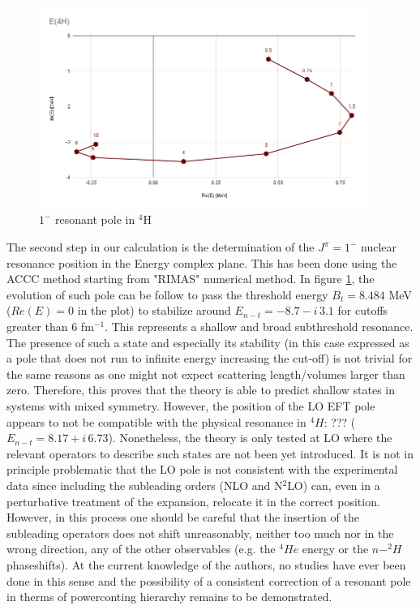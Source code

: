 \documentclass[aps,onecolumn,preprintnumbers,amsmath,amssymb,nofootinbib,superscriptaddress,notitlepage]{revtex4-1}
\begin{document}
%
%
\begin{figure}
\centering
\includegraphics[width=0.95\textwidth]{./Graphs/E4H} 
\caption{$1^-$ resonant pole in $^4$H}
\label{fig:Resonance_pole}
\end{figure}
%

%
The second step in our calculation is the determination of the $J^\pi=1^-$ nuclear resonance position in the Energy complex plane. 
This has been done using the ACCC method starting from "RIMAS" numerical method. 
In figure \ref{fig:Resonance_pole}, the evolution of such pole can be follow to pass the threshold energy $B_{t}=8.484$ MeV ($Re(E)=0$ in the plot) to stabilize around $E_{n-t}=-8.7-i\,3.1$ for cutoffs greater than $6$ fm$^{-1}$.
This represents a shallow and broad subthreshold resonance. 
The presence of such a state and especially its stability (in this case expressed as a pole that does not run to infinite energy increasing the cut-off) is not trivial for the same reasons as one might not expect scattering length/volumes larger than zero.
%
Therefore, this proves that the theory is able to predict shallow states in systems with mixed symmetry. 
However, the position of the LO EFT pole appears to not be compatible with the physical resonance in $^4H$: ??? ($E_{n-t}=8.17+i\,6.73$). %
Nonetheless, the theory is only tested at LO where the relevant operators to describe such states are not been yet introduced.
It is not in principle problematic that the LO pole is not consistent with the experimental data since including the subleading orders (NLO and N$^2$LO) can, even in a perturbative treatment of the expansion, relocate it in the correct position.
However, in this process one should be careful that the insertion of the subleading operators does not shift unreasonably, neither too much nor in the wrong direction, any of the other observables (e.g. the $^4He$ energy or the $n-^2H$ phaseshifts). 
At the current knowledge of the authors, no studies have ever been done in this sense and the possibility of a consistent correction of a resonant pole in therms of powerconting hierarchy remains to be demonstrated.
%
\end{document}
